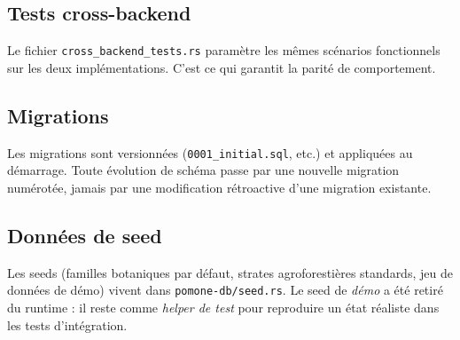 \subsection{Tests cross-backend}

Le fichier \texttt{cross\_backend\_tests.rs} paramètre les mêmes scénarios fonctionnels sur les deux implémentations. C'est ce qui garantit la parité de comportement.

\subsection{Migrations}

Les migrations sont versionnées (\texttt{0001\_initial.sql}, etc.) et appliquées au démarrage. Toute évolution de schéma passe par une nouvelle migration numérotée, jamais par une modification rétroactive d'une migration existante.

\subsection{Données de seed}

Les seeds (familles botaniques par défaut, strates agroforestières standards, jeu de données de démo) vivent dans \texttt{pomone-db/seed.rs}. Le seed de \emph{démo} a été retiré du runtime : il reste comme \emph{helper de test} pour reproduire un état réaliste dans les tests d'intégration.
